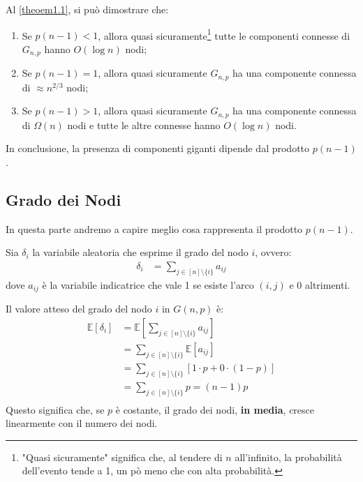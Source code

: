 \begin{teorema}
    Al \autoref{theoem1.1}, si può dimostrare che:
    \begin{enumerate}
        \item Se $p(n - 1) < 1$, allora quasi sicuramente\footnote{"Quasi sicuramente" significa che, al tendere di $n$ all'infinito, la probabilità dell'evento tende a 1, un pò meno che con alta probabilità.} tutte le componenti connesse di $G_{n,p}$ hanno $O(\log n)$ nodi;
        \item Se $p(n - 1) = 1$, allora quasi sicuramente $G_{n,p}$ ha una componente connessa di $\approx n^{2/3}$ nodi;
        \item Se $p(n - 1) > 1$, allora quasi sicuramente $G_{n,p}$ ha una componente connessa di $\Omega(n)$ nodi e tutte le altre connesse hanno $O(\log n)$ nodi.
    \end{enumerate}
\end{teorema}

 In conclusione, la presenza di componenti giganti dipende dal prodotto $p(n - 1)$.

\subsection{Grado dei Nodi}

In questa parte andremo a capire meglio cosa rappresenta il prodotto $p(n - 1)$.

\begin{definizione}
Sia $\delta_i$ la variabile aleatoria che esprime il grado del nodo $i$, ovvero:
\begin{align*}
    \delta_i &= \sum_{j \in [n] \setminus \{i\}} a_{ij}
\end{align*}
dove $a_{ij}$ è la variabile indicatrice che vale 1 se esiste l'arco $(i,j)$ e 0 altrimenti.

 Il valore atteso del grado del nodo $i$ in $G(n,p)$ è:
\begin{align*}
    \mathbb{E}[\delta_i] &= \mathbb{E}[\sum_{j \in [n] \setminus \{i\}} a_{ij}] \\
    &= \sum_{j \in [n] \setminus \{i\}} \mathbb{E}[a_{ij}] \\
    &= \sum_{j \in [n] \setminus \{i\}} [1 \cdot p + 0 \cdot (1 - p)] \\
    &= \sum_{j \in [n] \setminus \{i\}} p = (n - 1) p\\
\end{align*}
 Questo significa che, se $p$ è costante, il grado dei nodi, \textbf{in media}, cresce linearmente con il numero dei nodi. 
\end{definizione}


